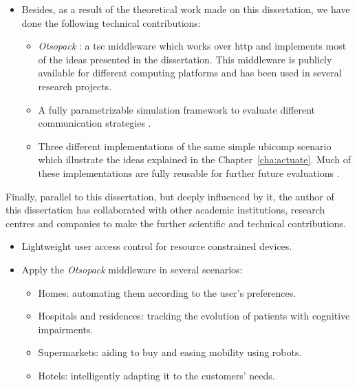 \begin{itemize}
  \item Besides, as a result of the theoretical work made on this dissertation, we have done the following technical contributions:
    \begin{itemize}
      \item \emph{Otsopack} : a \ac{tsc} middleware which works over \ac{http} and implements most of the ideas presented in the dissertation.
            This middleware is publicly available for different computing platforms and has been used in several research projects.
      \item A fully parametrizable simulation framework to evaluate different communication strategies .
      \item Three different implementations of the same simple \ac{ubicomp} scenario which illustrate the ideas explained in the Chapter~\ref{cha:actuate}.
	    Much of these implementations are fully reusable for further future evaluations .
    \end{itemize}
\end{itemize}


Finally, parallel to this dissertation, but deeply influenced by it, the author of this dissertation has collaborated with other academic institutions, research centres and companies to make the further scientific and technical contributions.
\begin{itemize}
  \item Lightweight user access control for resource constrained devices. %
  \item Apply the \emph{Otsopack} middleware in several scenarios:
    \begin{itemize}
      \item Homes: automating them according to the user's preferences. %
      \item Hospitals and residences: tracking the evolution of patients with cognitive impairments.  %
      \item Supermarkets: aiding to buy and easing mobility using robots.
      \item Hotels: intelligently adapting it to the customers' needs.
    \end{itemize}
\end{itemize}